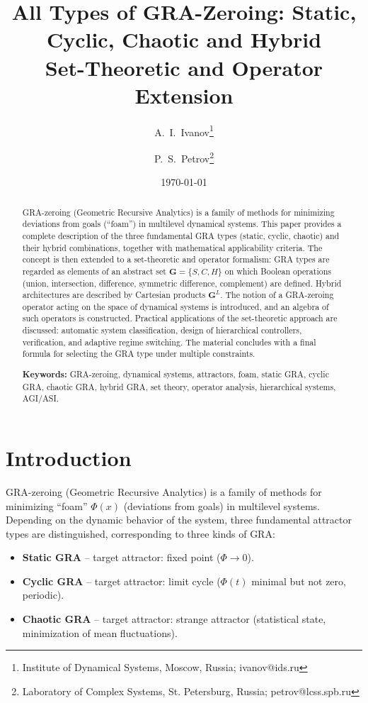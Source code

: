 \documentclass[12pt,a4paper]{article}
\title{All Types of GRA-Zeroing: Static, Cyclic, Chaotic and Hybrid \\[0.5em]
\large Set-Theoretic and Operator Extension}
\author{A.~I.~Ivanov\thanks{Institute of Dynamical Systems, Moscow, Russia; ivanov@ids.ru} \and 
P.~S.~Petrov\thanks{Laboratory of Complex Systems, St. Petersburg, Russia; petrov@lcss.spb.ru}}
\date{\today}
\newcommand{\G}{\mathbf{G}}
\begin{document}
\maketitle

\begin{abstract}
GRA-zeroing (Geometric Recursive Analytics) is a family of methods for minimizing deviations from goals (``foam'') in multilevel dynamical systems. This paper provides a complete description of the three fundamental GRA types (static, cyclic, chaotic) and their hybrid combinations, together with mathematical applicability criteria. The concept is then extended to a set-theoretic and operator formalism: GRA types are regarded as elements of an abstract set $\G = \{S, C, H\}$ on which Boolean operations (union, intersection, difference, symmetric difference, complement) are defined. Hybrid architectures are described by Cartesian products $\G^L$. The notion of a GRA-zeroing operator acting on the space of dynamical systems is introduced, and an algebra of such operators is constructed. Practical applications of the set-theoretic approach are discussed: automatic system classification, design of hierarchical controllers, verification, and adaptive regime switching. The material concludes with a final formula for selecting the GRA type under multiple constraints.

\textbf{Keywords:} GRA-zeroing, dynamical systems, attractors, foam, static GRA, cyclic GRA, chaotic GRA, hybrid GRA, set theory, operator analysis, hierarchical systems, AGI/ASI.
\end{abstract}

\tableofcontents
\newpage

\section{Introduction}

GRA-zeroing (Geometric Recursive Analytics) is a family of methods for minimizing ``foam'' $\Phi(x)$ (deviations from goals) in multilevel systems. Depending on the dynamic behavior of the system, three fundamental attractor types are distinguished, corresponding to three kinds of GRA:

\begin{itemize}
    \item \textbf{Static GRA} – target attractor: fixed point ($\Phi \to 0$).
    \item \textbf{Cyclic GRA} – target attractor: limit cycle ($\Phi(t)$ minimal but not zero, periodic).
    \item \textbf{Chaotic GRA} – target attractor: strange attractor (statistical state, minimization of mean fluctuations).
\end{itemize}
\end{document}
